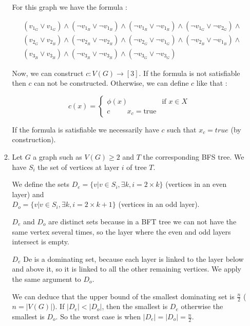 \documentclass{article}
\theoremstyle{plain}
\begin{document}
\begin{enumerate}
\begin{enumerate}
          For this graph we have the formula :

        \begin{align*}
          &(v_{1_G} \vee v_{1_G}) \wedge (\neg v_{1_B} \vee \neg v_{1_B}) \wedge
          (\neg v_{1_R} \vee \neg v_{1_R}) \wedge (\neg v_{1_G} \vee \neg v_{2_G})
          \wedge \\
          &(v_{2_G} \vee v_{2_B}) \wedge (\neg v_{2_R} \vee \neg v_{2_R})
          \wedge (\neg v_{2_G} \vee \neg v_{1_G})
          \wedge (\neg v_{2_B} \vee \neg v_{1_B}) \wedge \\
          &(v_{3_B} \vee v_{3_B}) \wedge (\neg v_{3_R} \vee \neg v_{3_R})
          \wedge (\neg v_{3_G} \vee \neg v_{3_G})
        \end{align*}

        Now, we can construct $c : V(G) \to [3]$. If the formula is not
        satisfiable then $c$ can not be constructed. Otherwise, we can define
        $c$ like that :

        \[
          c(x) =\begin{cases}
            \phi(x) & \text{if } x \in X \\
            c \hspace{1cm} x_c = \text{true}
          \end{cases}
        \]

        If the formula is satisfiable we necessarily have $c$ such that $x_c =
        true$ (by construction).

      \item Let $G$ a graph such as $V(G) \geq 2$ and $T$ the corresponding BFS
        tree. We have $S_i$ the set of vertices at layer $i$ of tree $T$.

        We define the sets $D_e = \{v | v \in S_i, \exists k, i = 2 \times k\}$
        (vertices in an even layer) and \\
        $D_o = \{v | v \in S_i, \exists k, i = 2 \times k + 1\}$ (vertices in an
        odd layer).

        $D_e$ and $D_o$ are distinct sets because in a BFT tree we can not have
        the same vertex several times, so the layer where the even and odd
        layers intersect is empty.

        $D_e$ De is a dominating set, because each layer is linked to
        the layer below and above it, so it is linked to all the other
        remaining vertices. We apply the same argument to $D_o$.

        We can deduce that the upper bound of the smallest dominating set is
        $\frac n 2$ ($n = |V(G)|$). If $|D_e| < |D_o|$, then the smallest is
        $D_e$ otherwise the smallest is $D_o$.
        So the worst case is when $|D_e| = |D_o| = \frac n 2$.


\end{enumerate}
\end{enumerate}
\end{document}
